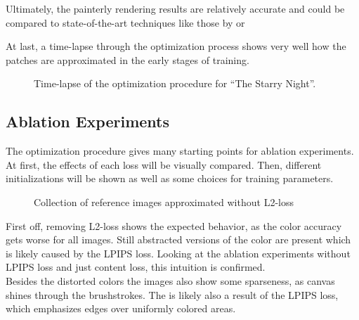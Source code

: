 Ultimately, the painterly rendering results are relatively accurate and could be compared to state-of-the-art techniques like those by \citeauthor*{paintbot} or \citeauthor*{hertzmann}

At last, a time-lapse through the optimization process shows very well how the patches are approximated in the early stages of training.
\begin{figure}[!htp]
    \caption{Time-lapse of the optimization procedure for ``The Starry Night''.}
\end{figure}

\subsection{Ablation Experiments}
The optimization procedure gives many starting points for ablation experiments.
At first, the effects of each loss will be visually compared.
Then, different initializations will be shown as well as some choices for training
parameters.

\begin{figure}[!htb]
    \caption{Collection of reference images approximated without L2-loss}
\end{figure}
First off, removing L2-loss shows the expected behavior, as the color accuracy gets worse for all images.
Still abstracted versions of the color are present which is likely caused by the LPIPS loss.
Looking at the ablation experiments without LPIPS loss and just content loss, this intuition is confirmed.\\
Besides the distorted colors the images also show some sparseness, as canvas shines through the brushstrokes.
The is likely also a result of the LPIPS loss, which emphasizes edges over uniformly colored areas.

